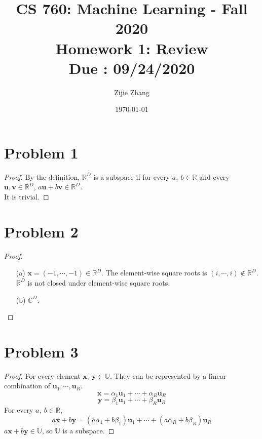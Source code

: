 \documentclass{article}
\title{CS 760: Machine Learning - Fall 2020\\
        {\Large \textbf{Homework 1: Review}}\\
        {\normalsize \textbf{Due : 09/24/2020}}
    }
\author{Zijie Zhang}
\date{\today}
\begin{document}
    \maketitle
    
\section*{Problem 1}
    \begin{proof}
        By the definition, $\mathbb{R}^D$ is a subspace if for every
        $a,\ b\in \mathbb{R}$ and every $\bm{u}, \bm{v} \in \mathbb{R}^D$,
        $a\bm{u}+b\bm{v} \in \mathbb{R}^D$.\\
        \indent It is trivial.
    \end{proof}

\section*{Problem 2}
    \begin{proof}
        \indent
        \begin{itemize}
            \item[(a)]
                $\bm{x} = (-1,\cdots,-1) \in \mathbb{R}^D$. The element-wise square roots is
                $(i,\cdots,i) \not\in \mathbb{R}^D$.\\
                $\mathbb{R}^D$ is not closed under element-wise square roots.
            \item[(b)] 
                $\mathbb{C}^D$.
        \end{itemize}
    \end{proof}

\section*{Problem 3}
    \begin{proof}
        For every element $\bm{x},\ \bm{y} \in \mathbb{U}$. They can be represented by a linear
        combination of $\bm{u}_1, \cdots, \bm{u}_R$.
        $$\bm{x} = \alpha_1 \bm{u}_1 + \cdots + \alpha_R \bm{u}_R$$
        $$\bm{y} = \beta_1 \bm{u}_1 + \cdots + \beta_R \bm{u}_R$$
        For every $a,\ b\in\mathbb{R}$,
        $$a\bm{x}+b\bm{y} = (a\alpha_1+b\beta_1)\bm{u}_1+\cdots+(a\alpha_R+b\beta_R)\bm{u}_R $$
        $a\bm{x}+b\bm{y} \in \mathbb{U}$, so $\mathbb{U}$ is a subspace.
    \end{proof}
\end{document}
